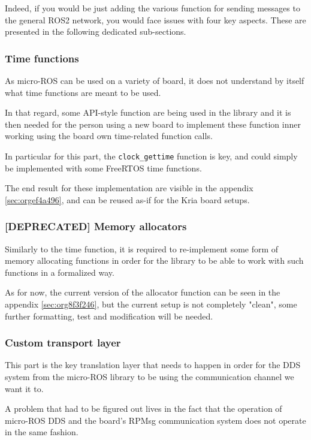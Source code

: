\documentclass[10pt]{article}
\begin{document}
Indeed, if you would be just adding the various function for sending messages to
the general ROS2 network, you would face issues with four key aspects.
These are presented in the following dedicated sub-sections.

\subsubsection{Time functions}
\label{sec:orgc249f74}
As micro-ROS can be used on a variety of board, it does not understand by itself
what time functions are meant to be used.

In that regard, some API-style function are being
used in the library and it is then needed for the person using a new board
to implement these function inner working using the board own time-related
function calls.

In particular for this part, the \texttt{clock\_gettime} function is key, and could
simply be implemented with some FreeRTOS time functions.

The end result for these implementation are visible in the appendix \ref{sec:orgef4a496},
and can be reused as-if for the Kria board setups.

\subsubsection{[DEPRECATED] Memory allocators}
\label{sec:orgc891cd1}
Similarly to the time function, it is required to re-implement some form of memory allocating
functions in order for the library to be able to work with such functions in a formalized way.

As for now, the current version of the allocator function can be seen in the
appendix \ref{sec:org8f3f246}, but the current setup is not
completely "clean", some further formatting, test and modification will be needed.

\subsubsection{Custom transport layer}
\label{sec:org6f999af}
This part is the key translation layer that needs to happen in order for the
DDS system from the micro-ROS library to be using the communication channel we
want it to.

A problem that had to be figured out lives in the fact that the operation of micro-ROS DDS
and the board's RPMsg communication system does not operate in the same fashion.
\end{document}
